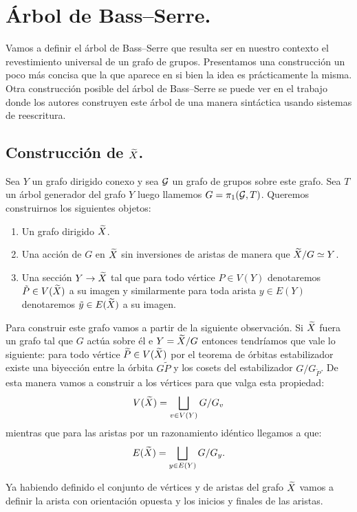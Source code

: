 \documentclass[tesis.tex]{subfiles}
\begin{document}
\section{Árbol de Bass--Serre.}\label{secc_arb_BS}

Vamos a definir el árbol de Bass--Serre que resulta ser en nuestro contexto el revestimiento universal de un grafo de grupos.
Presentamos una construcción un poco más concisa que la que aparece en \cite{serre2002trees} si bien la idea es prácticamente la misma.
Otra construcción posible del árbol de Bass--Serre se puede ver en el trabajo \cite{diekert2017context} donde los autores construyen este árbol de una manera sintáctica usando sistemas de reescritura.

\subsection{Construcción de $\widetilde X$.}

Sea  $Y$ un grafo dirigido conexo y sea ${\cal G}$ un grafo de grupos sobre este grafo.
Sea $T$ un árbol generador del grafo $Y$ luego llamemos $G = \pi_1({\cal G},T)$.
Queremos construirnos los siguientes objetos:

\begin{enumerate}[]
	\item Un grafo dirigido $\widetilde X$.
	\item Una acción de $G$ en $\widetilde X$ sin inversiones de aristas de manera que $\widetilde X / G \simeq Y$.
	\item Una sección $Y \to \widetilde X$ tal que
	para todo vértice $P \in V(Y)$ denotaremos $\tilde P \in V(\widetilde X)$ a su imagen y similarmente para toda arista $y \in E(Y)$ denotaremos $\tilde y \in E(\widetilde X)$ a su imagen.
\end{enumerate}

Para construir este grafo vamos a partir de la siguiente observación.
Si $\widetilde X$ fuera un grafo tal que $G$ actúa sobre él e 
$Y = \widetilde X / G$ entonces tendríamos que vale lo siguiente:
para todo vértice $\widetilde{ P} \in V(\widetilde X)$ por el teorema de órbitas estabilizador existe una biyección entre la órbita $G \widetilde{P} $ y los cosets del estabilizador $G / G_{\widetilde P}$.
De esta manera vamos a construir a los vértices para que valga esta propiedad:
\[
V(\widetilde X) = \bigsqcup_{v \in V(Y)} G/G_{v}
\]
mientras que para las aristas por un razonamiento idéntico llegamos a que: 
\[
E(\widetilde X) = \bigsqcup_{y \in E(Y)} G/G_{y}.
\]

Ya habiendo definido el conjunto de vértices y de aristas del grafo $\widetilde X$
vamos a definir la arista con orientación opuesta y los inicios y finales de las aristas.
\end{document}
